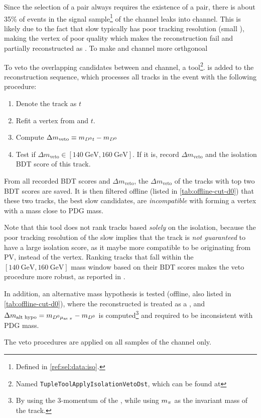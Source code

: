 Since the selection of a \Dstar\muon pair always requires the existence
of a \Dz\muon pair,
there is about 35\% of events in the signal sample\footnote{
    Defined in \cref{ref:sel:data:iso}.
} of the \Dstar channel leaks into \Dz channel.
This is likely due to the fact that slow \pion typically has poor tracking
resolution (small \ipChiSq), making the \Dz\pion vertex of poor quality which
makes the reconstruction fail and \Dstar partially reconstructed as \Dz.
To make \Dstar and \Dz channel more orthgonoal

To veto the overlapping candidates between \Dz and \Dstar channel,
a tool\footnote{
    Named \texttt{TupleToolApplyIsolationVetoDst}, which can be found at
}.
is added to the \davinci reconstruction sequence, which processes all tracks
in the event with the following procedure:

\begin{enumerate}
    \item Denote the track as $t$
    \item Refit a vertex from \Dz and $t$.
    \item Compute $\Delta m_\text{veto} \equiv m_{{{D}^0} t} - m_{{D}^0}$
    \item Test if $\Delta m_\text{veto} \in [140~\text{GeV}, 160~\text{GeV}]$.
        If it is, record $\Delta m_\text{veto}$ and the isolation BDT
        score of this track.
\end{enumerate}

From all recorded BDT scores and $\Delta m_\text{veto}$, the
$\Delta m_\text{veto}$ of the tracks with top two BDT scores are saved.
It is then filtered offline (listed in \cref{tab:offline-cut-d0})
that these two tracks,
the best slow \pion candidates,
are \emph{incompatible} with
forming a \Dz\pion vertex with a mass close to \Dstar PDG mass.

Note that this tool does not rank tracks based \emph{solely} on the isolation,
because the poor tracking resolution of the slow \pion implies that the track is
\emph{not guaranteed} to have a large isolation score, as it maybe more
compatible to be originating from PV, instead of the \B vertex.
Ranking tracks that fall within the $[140~\text{GeV}, 160~\text{GeV}]$
mass window based on their BDT scores
makes the veto procedure more robust, as reported in \cite{LHCb-ANA-2020-056}.

In addition, an alternative mass hypothesis is tested
(offline, also listed in \cref{tab:offline-cut-d0}), where the reconstructed
\muon is treated as a \pion,
and $\Delta m_\text{alt hypo} = m_{{{D}^0}{\mu}_\text{as {\ensuremath{\pi}}}} - m_{{D}^0}$
is computed\footnote{
    By using the 3-momentum of the \muon, while using $m_{\pi}$ as the invariant
    mass of the track.
} and required to be inconsistent with \Dstar PDG mass.

The veto procedures are applied on all samples of the \Dz channel only.
